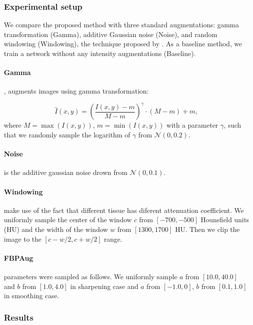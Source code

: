 \subsubsection{Experimental setup}

We compare the proposed method with three standard augmentations: gamma transformation (Gamma), additive Gaussian noise (Noise), and random windowing (Windowing), the technique proposed by \cite{kloenne2020domain}. As a baseline method, we train a network without any intensity augmentations (Baseline).

\paragraph{Gamma} \cite{tureckova2020improving}, augments images using gamma transformation:

\begin{equation}
	\hat{I}(x, y) = \left(\frac{I(x, y) - m}{M - m}\right)^\gamma \cdot(M - m) + m,
\end{equation}
where $M = \max(I(x, y))$, $m=\min(I(x, y))$ with a parameter $\gamma$, such that we randomly sample the logarithm of $\gamma$ from $\mathcal{N}(0, 0.2)$. 

\paragraph{Noise} is the additive gaussian noise drown from $\mathcal{N}(0, 0.1)$. 

\paragraph{Windowing} \cite{kloenne2020domain} make use of the fact that different tissue has diferent attenuation coefficient. We uniformly sample the center of the window $c$ from $[-700, -500]$ Hounsfield units (HU)  and the width of the window $w$ from $[1300, 1700]$ HU. Then we clip the image to the $[c - w/2, c + w/2]$ range.

\paragraph{FBPAug} parameters were sampled as follows. We uniformly sample $a$ from $[10.0, 40.0]$ and  $b$ from $[1.0, 4.0]$ in sharpening case and $a$ from $[-1.0, 0]$, $b$ from $[0.1, 1.0]$ in smoothing case. 


\subsubsection{Results}

